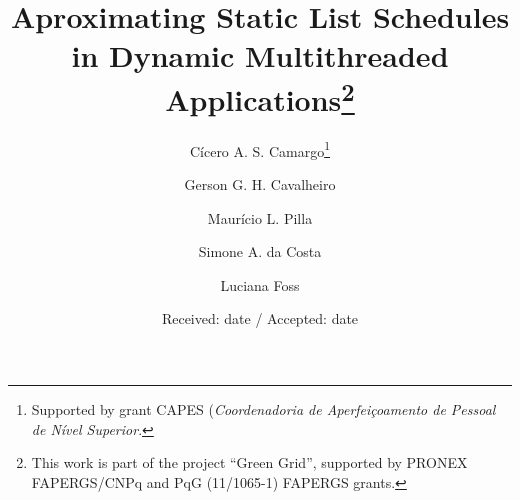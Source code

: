 \documentclass[twocolumn]{svjour3}
\begin{document}
\title{Aproximating Static List Schedules in Dynamic Multithreaded Applications\thanks{This work is part of the project ``Green Grid'', supported by PRONEX FAPERGS/CNPq and PqG (11/1065-1) FAPERGS grants.}}


\author{Cícero A. S. Camargo\thanks{Supported by grant CAPES (\emph{Coordenadoria de Aperfeiçoamento de Pessoal de Nível Superior}.}\and
        Gerson G. H. Cavalheiro
        \and Maurício L. Pilla
        \and Simone A. da Costa
        \and Luciana Foss
}



%
\date{Received: date / Accepted: date}


\maketitle
\end{document}
